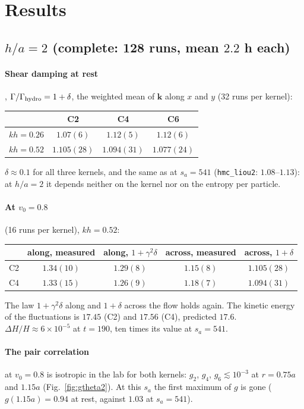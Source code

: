 \documentclass[11pt,aps,preprint,nofootinbib,superscriptaddress,tightenlines]{revtex4-2}
\def\Fig#1{Fig.~\ref{#1}}
\let\oldparagraph\paragraph
\renewcommand{\paragraph}{\par\bigskip\oldparagraph}
\begin{document}
\section{Results}
\label{sec:results}

\subsection{$h/a=2$ (complete: 128 runs, mean $2.2$ h each)}

\paragraph{Shear damping at rest}, $\Gamma/\Gamma_{\rm hydro}=1+\delta$, the weighted mean of $\bm k$ along $x$ and $y$ (32 runs per kernel):
\begin{center}
\begin{tabular}{lccc}
\hline
 & C2 & C4 & C6 \\ \hline
$kh=0.26$ & $1.07(6)$ & $1.12(5)$ & $1.12(6)$ \\
$kh=0.52$ & $1.105(28)$ & $1.094(31)$ & $1.077(24)$ \\
\hline
\end{tabular}
\end{center}
$\delta\approx0.1$ for all three kernels, and the same as at $s_a=541$ (\texttt{hmc\_liou2}: $1.08$--$1.13$): at $h/a=2$ it depends neither on
the kernel nor on the entropy per particle.

\paragraph{At $v_0=0.8$} (16 runs per kernel), $kh=0.52$:
\begin{center}
\begin{tabular}{lcccc}
\hline
 & along, measured & along, $1+\gamma^2\delta$ & across, measured & across, $1+\delta$ \\ \hline
C2 & $1.34(10)$ & $1.29(8)$ & $1.15(8)$ & $1.105(28)$ \\
C4 & $1.33(15)$ & $1.26(9)$ & $1.18(7)$ & $1.094(31)$ \\
\hline
\end{tabular}
\end{center}
The law $1+\gamma^2\delta$ along and $1+\delta$ across the flow holds again.  The kinetic energy of the fluctuations is $17.45$ (C2) and
$17.56$ (C4), predicted $17.6$.  $\Delta H/H\approx6\times10^{-5}$ at $t=190$, ten times its value at $s_a=541$.

\paragraph{The pair correlation} at $v_0=0.8$ is isotropic in the lab for both kernels: $g_2$, $g_4$, $g_6\lesssim10^{-3}$ at $r=0.75a$ and $1.15a$
(\Fig{fig:gtheta2}).  At this $s_a$ the first maximum of $g$ is gone ($g(1.15a)=0.94$ at rest, against $1.03$ at $s_a=541$).
\end{document}
